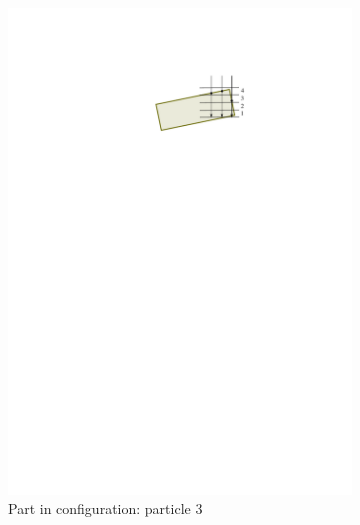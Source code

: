 \documentclass[../thesis.tex]{subfiles}
\begin{document}
\begin{figure}
\begin{subfigure}[b]{0.2\linewidth}
        \includegraphics[width=\textwidth, clip, trim=4.2in 8.4in 2.5in 1.7in]{./Localization/bins_p3}
        \caption{Part in configuration: particle 3}
        \label{bins:p3}
    \end{subfigure}
    \hfill
    \begin{subfigure}[b]{0.38\linewidth}

\end{subfigure}
\end{figure}
\end{document}
